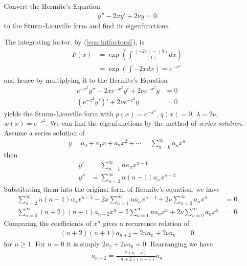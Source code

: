\begin{exmp}
\label{exmp:hermiteeqn}
Convert the Hermite's Equation
\begin{align}
y'' - 2xy' + 2\nu y = 0
\end{align}
to the Sturm-Liouville form and find its eigenfunctions.
\end{exmp}
\begin{solution}
The integrating factor, by (\ref{eqn:intfactorsl}), is
\begin{align*}
F(x) &= \exp(\int \frac{(-2x) - (0)}{(1)} dx) \\
&= \exp(\int -2x dx) = e^{-x^2}
\end{align*}
and hence by multiplying it to the Hermite's Equation
\begin{align}
e^{-x^2}y'' - 2xe^{-x^2}y' + 2\nu e^{-x^2} y &= 0 \nonumber \\
(e^{-x^2}y')' + 2\nu e^{-x^2} y &= 0
\end{align}
yields the Sturm-Liouville form with $p(x) = e^{-x^2}$, $q(x) = 0$, $\lambda = 2\nu$, $w(x) = e^{-x^2}$. We can find the eigenfunctions by the method of \textit{series solution}. Assume a series solution of 
\begin{align}
y = a_0 + a_1x + a_2x^2 + \cdots = \sum_{n=0}^{\infty} a_n x^n    
\end{align}
then
\begin{subequations}
\begin{align}
y' &= \sum_{n=1}^{\infty} n a_nx^{n-1} \\
y'' &= \sum_{n=2}^{\infty} n(n-1) a_nx^{n-2}
\end{align}    
\end{subequations}
Substituting them into the original form of Hermite's equation, we have
\begin{align}
\sum_{n=2}^{\infty} n(n-1) a_nx^{n-2} - 2x\sum_{n=1}^{\infty} n a_nx^{n-1} + 2\nu \sum_{n=0}^{\infty} a_n x^n &= 0 \nonumber \\
\sum_{n=0}^{\infty} (n+2)(n+1) a_{n+2}x^{n} - 2\sum_{n=1}^{\infty} n a_nx^{n} + 2\nu \sum_{n=0}^{\infty} a_n x^n &= 0 
\end{align}
Comparing the coefficients of $x^n$ gives a recurrence relation of
\begin{align}
(n+2)(n+1)a_{n+2} - 2n a_n + 2\nu a_n &= 0
\end{align}
for $n \geq 1$. For $n=0$ it is simply $2a_2 + 2\nu a_0 = 0$. Rearranging we have
\begin{align}
a_{n+2} = \frac{2(n-\nu)}{(n+2)(n+1)}a_n
\end{align}

\end{solution}
